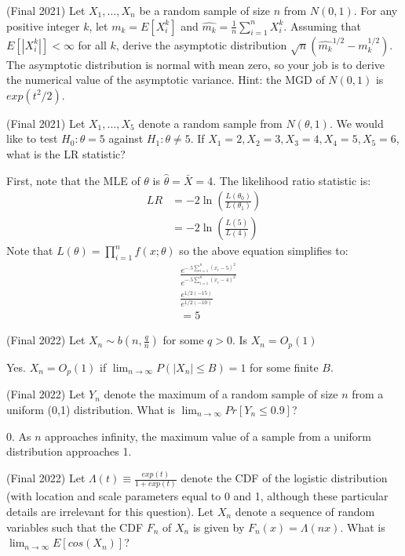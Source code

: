\documentclass[answers]{exam}
\begin{document}
\begin{questions}
\question (Final 2021) Let $X_1,...,X_n$ be a random sample of size $n$ from $N(0,1)$. For any positive integer $k$, let $m_k = E[X_i^k]$ and $\hat{m_k} = \frac{1}{n} \sum_{i=1}^n X_i^k$. Assuming that $E[|X_i^k|] < \infty$ for all $k$, derive the asymptotic distribution $\sqrt{n}(\hat{m_k}^{1/2} - m_k^{1/2})$. The asymptotic distribution is normal with mean zero, so your job is to derive the numerical value of the asymptotic variance. Hint: the MGD of $N(0,1)$ is $exp(t^2/2)$.
\begin{solution}
\end{solution}

\question (Final 2021) Let $X_1,...,X_5$ denote a random sample from $N(\theta,1)$. We would like to test $H_0 : \theta = 5$ against $H_1 : \theta \ne 5$. If $X_1=2, X_2=3, X_3=4, X_4=5, X_5=6$, what is the LR statistic?
\begin{solution}
    First, note that the MLE of $\theta$ is $\hat{\theta} = \bar{X} = 4$. The likelihood ratio statistic is:
    \begin{align*} LR &= -2\ln(\frac{L(\theta_0)}{L(\theta_1)})\\
    &= -2\ln(\frac{L(5)}{L(4)})
    \end{align*}
    Note that $L(\theta) = \prod_{i=1}^n f(x;\theta)$ so the above equation simplifies to:
    \begin{align*} &\frac{e^{-.5 \sum_{i=1}^n (x_i - 5)^2}}{e^{-.5 \sum_{i=1}^n (x_i - 4)^2}}\\
    &\frac{e^{1/2(-15)}}{e^{1/2(-10)}} \\
    &= 5\end{align*}
\end{solution}

\question (Final 2022) Let $X_n \sim b(n,\frac{q}{n})$ for some $q>0$. Is $X_n = O_p(1)$
\begin{solution}
    Yes. $X_n = O_p(1)$ if $\lim_{n \to \infty} P(|X_n| \leq B) = 1$ for some finite $B$. 
\end{solution}

\question (Final 2022) Let $Y_n$ denote the maximum of a random sample of size $n$ from a uniform (0,1) distribution. What is $\lim_{n \to \infty} Pr[Y_n \leq 0.9]$?
\begin{solution}
    0. As $n$ approaches infinity, the maximum value of a sample from a uniform distribution approaches 1.
\end{solution}

\question (Final 2022) Let $\Lambda(t) \equiv \frac{exp(t)}{1+exp(t)}$ denote the CDF of the logistic distribution (with location and scale parameters equal to 0 and 1, although these particular details are irrelevant for this question). Let $X_n$ denote a sequence of random variables such that the CDF $F_n$ of $X_n$ is given by $F_n(x) = \Lambda(nx)$. What is $\lim_{n \to \infty} E[cos(X_n)]$?
\begin{solution}


\end{solution}
\end{questions}
\end{document}
